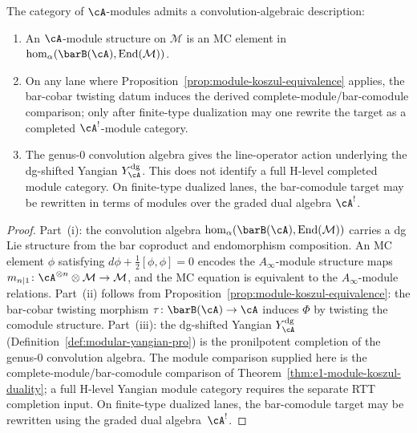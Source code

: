 \begin{construction}
\label{constr:module-mc-twisting}
The category of $\cA$-modules admits a convolution-algebraic description:
\begin{enumerate}[label=\textup{(\roman*)}]
\item An $\cA$-module structure on $\mathcal{M}$ is an MC element in $\mathrm{hom}_\alpha(\barB(\cA), \operatorname{End}(\mathcal{M}))$.
\item On any lane where Proposition~\ref{prop:module-koszul-equivalence}
 applies, the bar-cobar twisting datum induces the derived
 complete-module/bar-comodule comparison; only after finite-type
 dualization may one rewrite the target as a completed
 $\cA^!$-module category.
\item The genus-$0$ convolution algebra gives the line-operator action
 underlying the dg-shifted Yangian $Y^{\mathrm{dg}}_\cA$. This does
 not identify a full H-level completed module category. On finite-type
 dualized lanes, the bar-comodule target may be rewritten in terms of
 modules over the graded dual algebra $\cA^!$.
\end{enumerate}
\end{construction}

\begin{proof}
Part~(i): the convolution algebra $\mathrm{hom}_\alpha(\barB(\cA), \operatorname{End}(\mathcal{M}))$ carries a dg Lie structure from the bar coproduct and endomorphism composition.
An MC element $\phi$ satisfying $d\phi + \tfrac{1}{2}[\phi, \phi] = 0$ encodes the $A_\infty$-module structure maps $m_{n|1}\colon \cA^{\otimes n} \otimes \mathcal{M} \to \mathcal{M}$, and the MC equation is equivalent to the $A_\infty$-module relations.
Part~(ii) follows from Proposition~\ref{prop:module-koszul-equivalence}: the bar-cobar twisting morphism $\tau\colon \barB(\cA) \to \cA$ induces $\Phi$ by twisting the comodule structure.
Part~(iii): the dg-shifted Yangian $Y^{\mathrm{dg}}_\cA$
\textup{(}Definition~\ref{def:modular-yangian-pro}\textup{)} is the
pronilpotent completion of the genus-$0$ convolution algebra. The
module comparison supplied here is the complete-module/bar-comodule
comparison of Theorem~\ref{thm:e1-module-koszul-duality}; a full
H-level Yangian module category requires the separate RTT completion
input. On finite-type dualized lanes, the bar-comodule target may be
rewritten using the graded dual algebra~$\cA^!$.
\end{proof}

